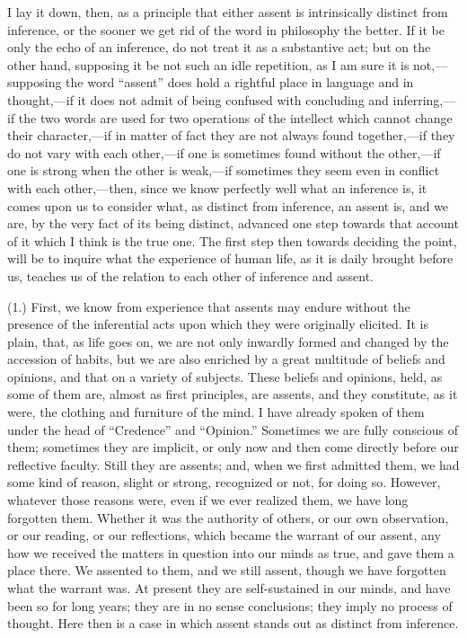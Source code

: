 I lay it down, then, as a principle that either assent is
intrinsically distinct from inference, or the sooner we get rid of the
word in philosophy the better. If it be only the echo of an inference,
do not treat it as a substantive act; but on the other hand, supposing
it be not such an idle repetition, as I am sure it is not,—supposing
the word ``assent'' does hold a rightful place in language and
in thought,—if it does not admit of being confused with concluding
and inferring,—if the two words are used for two operations of the
intellect which cannot change their character,—if in matter of fact
they are not always found together,—if they do not vary with each
other,—if one is sometimes found without the other,—if one is
strong when the other is weak,—if sometimes they seem even in
conflict with each other,—then, since we know perfectly well what an
inference is, it comes upon us to consider what, as distinct from
inference, an assent is, and we are, by the very fact of its being
distinct, advanced one step towards that account of it which I think
is the true one. The first step then towards deciding the point, will
be to inquire what the experience of human life, as it is daily
brought before us, teaches us of the relation to each other of
inference and assent.

(1.) First, we know from experience that assents may endure without
the presence of the inferential acts upon which they were originally
elicited. It is plain, that, as life goes on, we are not only inwardly
formed and changed by the accession of habits, but we are also
enriched by a great multitude of beliefs and opinions, and that on a
variety of subjects. These beliefs and opinions, held, as some of them
are, almost as first principles, are assents, and they constitute, as
it were, the clothing and furniture of the mind. I have already spoken
of them under the head of ``Credence'' and
``Opinion.'' Sometimes we are fully conscious of them;
sometimes they are implicit, or only now and then come directly before
our reflective faculty. Still they are assents; and, when we first
admitted them, we had some kind of reason, slight or strong,
recognized or not, for doing so. However, whatever those reasons were,
even if we ever realized them, we have long forgotten them. Whether it
was the authority of others, or our own observation, or our reading,
or our reflections, which became the warrant of our assent, any how we
received the matters in question into our minds as true, and gave them
a place there. We assented to them, and we still assent, though we
have forgotten what the warrant was. At present they are
self-sustained in our minds, and have been so for long years; they are
in no sense conclusions; they imply no process of thought. Here then
is a case in which assent stands out as distinct from inference.

